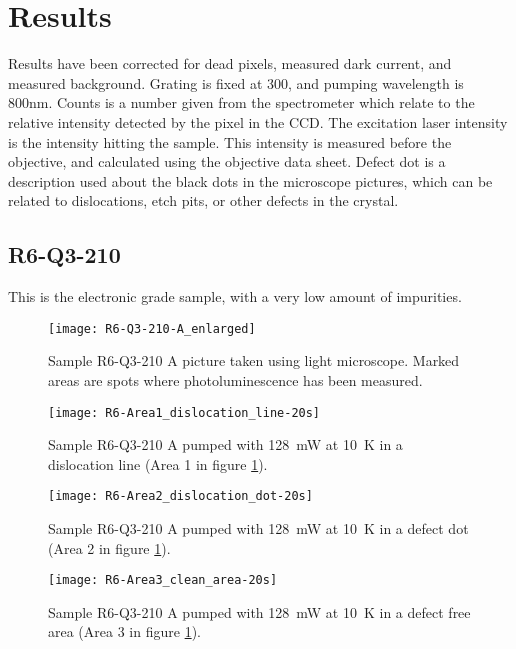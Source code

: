 \section{Results}

Results have been corrected for dead pixels, measured dark current, and measured background. Grating is fixed at 300, and pumping wavelength is 800nm. Counts is a number given from the spectrometer which relate to the relative intensity detected by the pixel in the CCD. The excitation laser intensity is the intensity hitting the sample. This intensity is measured before the objective, and calculated using the objective data sheet. Defect dot is a description used about the black dots in the microscope pictures, which can be related to dislocations, etch pits, or other defects in the crystal.

\subsection{R6-Q3-210}

This is the electronic grade sample, with a very low amount of impurities.

\begin{figure}[H]
\centering
\texttt{[image: R6-Q3-210-A\_enlarged]}
\caption[R6-Q3-210 A from light microscope]{Sample R6-Q3-210 A picture taken using light microscope. Marked areas are spots where photoluminescence has been measured.}
\label{fig:R6-Q3-210-A_enlarged}%
\end{figure}


\begin{figure}[H]
\centering
\texttt{[image: R6-Area1\_dislocation\_line-20s]}
\caption[R6-Q3-210 at a dislocation line]{Sample R6-Q3-210 A pumped with 128~mW at 10~K in a dislocation line (Area 1 in figure \ref{fig:R6-Q3-210-A_enlarged}).}
\label{fig:R6-Area1_dislocation_line-20s}%
\end{figure}


\begin{figure}[H]
\centering
\texttt{[image: R6-Area2\_dislocation\_dot-20s]}
\caption[R6-Q3-210 at a defect dot]{Sample R6-Q3-210 A pumped with 128~mW at 10~K in a defect dot (Area 2 in figure \ref{fig:R6-Q3-210-A_enlarged}).}
\label{fig:R6-Area2_dislocation_dot-20s}%
\end{figure}


\begin{figure}[H]
\centering
\texttt{[image: R6-Area3\_clean\_area-20s]}
\caption[R6-Q3-210 at a defect free area]{Sample R6-Q3-210 A pumped with 128~mW at 10~K in a defect free area (Area 3 in figure \ref{fig:R6-Q3-210-A_enlarged}).}
\label{fig:R6-Area3_clean_area-20s}%
\end{figure}


